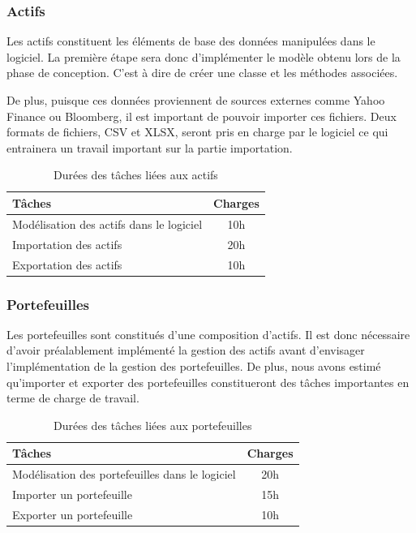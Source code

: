 \documentclass[a4paper]{report}
\begin{document}
\subsubsection{Actifs}
Les actifs constituent les éléments de base des données manipulées dans le logiciel. La première étape sera donc d'implémenter le modèle obtenu lors de la phase de conception. C'est à dire de créer une classe et les méthodes associées.

De plus, puisque ces données proviennent de sources externes comme Yahoo Finance ou Bloomberg, il est important de pouvoir importer ces fichiers. Deux formats de fichiers, CSV et XLSX, seront pris en charge par le logiciel ce qui entrainera un travail important sur la partie importation.

\begin{table}[H]
\centering
  \begin{tabularx}{0.8\textwidth}{| X | c |}
    \hline
	Tâches & Charges \\
    \hline
    Modélisation des actifs dans le logiciel & 10h \\
    Importation des actifs & 20h \\
    Exportation des actifs & 10h \\
    \hline
  \end{tabularx}
  \caption{Durées des tâches liées aux actifs}
\end{table}


\subsubsection{Portefeuilles}
Les portefeuilles sont constitués d'une composition d'actifs. Il est donc nécessaire d'avoir préalablement implémenté la gestion des actifs avant d'envisager l'implémentation de la gestion des portefeuilles.
De plus, nous avons estimé qu'importer et exporter des portefeuilles constitueront des tâches importantes en terme de charge de travail.

\begin{table}[H]
\centering
  \begin{tabularx}{0.8\textwidth}{| X | c |}
    \hline
	Tâches & Charges \\
    \hline
     Modélisation des portefeuilles dans le logiciel &  20h\\
     Importer un portefeuille &  15h\\
     Exporter un portefeuille &  10h\\
    \hline
  \end{tabularx}
  \caption{Durées des tâches liées aux portefeuilles}
\end{table}
\end{document}
